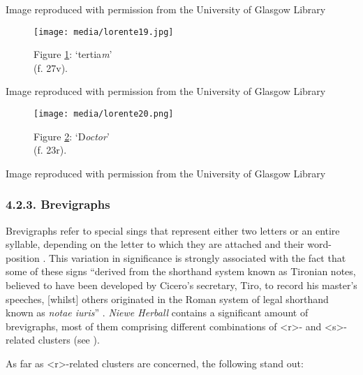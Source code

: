 \documentclass{article}
\begin{document}
 Image reproduced with permission from the University of Glasgow Library 


 
  \begin{figure}
    \texttt{[image: media/lorente19.jpg]}
    \caption{Figure \ref{fig:lorente19}: `tertia\emph{m}' \\ (f. 27v).}
    \label{fig:lorente19}
  \end{figure}


 Image reproduced with permission from the University of Glasgow Library 


 
  \begin{figure}
    \texttt{[image: media/lorente20.png]}
    \caption{Figure \ref{fig:lorente20}: `D\emph{octor}' \\  (f. 23r).}
    \label{fig:lorente20}
\end{figure}


 Image reproduced with permission from the University of Glasgow Library 


 
\subsubsection{4.2.3. Brevigraphs}

Brevigraphs refer to special sings that represent either two
letters or an entire syllable, depending on the letter to which they are
attached and their word-position \citep[23]{petti_english_1977}. This variation in
significance is strongly associated with the fact that some of these
signs ``derived from the shorthand system known as Tironian notes,
believed to have been developed by Cicero's secretary, Tiro, to record
his master's speeches, {[}whilst{]} others originated in the Roman
system of legal shorthand known as \emph{notae iuris}'' \citep[89]{clemens_introduction_2007}. \emph{Niewe Herball} contains a significant amount of
brevigraphs, most of them comprising different combinations of
\textless r\textgreater- and \textless s\textgreater-related clusters
(see \cite[172]{de_la_cruz-cabanillas_abbreviations_2018}).

As far as \textless r\textgreater-related clusters are concerned, the
following stand out:
\end{document}
